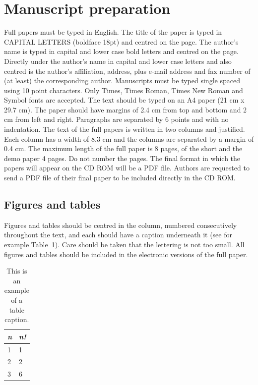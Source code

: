 \documentclass{article}\usepackage{graphicx, color}
\begin{document}
\section{Manuscript preparation}
Full papers must be typed in English. The title of the
paper is typed in CAPITAL LETTERS (boldface 18pt)
and centred on the page. The author's name is typed in
capital and lower case bold letters and centred on the
page. Directly under the author's name in capital and
lower case letters and also centred is the author's
affiliation, address, plus e-mail address and fax number of
(at least) the corresponding author. Manuscripts must be
typed single spaced using 10 point characters. Only
Times, Times Roman, Times New Roman and Symbol
fonts are accepted. The text should be typed on an A4
paper (21 cm x 29.7 cm). The paper should have margins
of 2.4 cm from top and bottom and 2 cm from left and
right. Paragraphs are separated by 6 points and with no
indentation. The text of the full papers is written in two
columns and justified. Each column has a width of 8.3 cm
and the columns are separated by a margin of 0.4 cm. The
maximum length of the full paper is 8 pages, of the short
and the demo paper 4 pages. Do not number the pages.
The final format in which the papers will appear on the
CD ROM will be a PDF file. Authors are requested to send
a PDF file of their final paper to be included directly
in the CD ROM.

\subsection{Figures and tables}
Figures and tables should be centred in the column,
numbered consecutively throughout the text, and each
should have a caption underneath it (see for example
Table~\ref{tab1}). Care should be taken that the lettering
is not too small. All figures and tables should be included
in the electronic versions of the full paper.


\begin{table}[htb!]
\begin{center}

\begin{tabular}{|l|l|}
\hline
{\em n} & {\em n!} \\
\hline
1 & 1  \\
2 & 2  \\
3  & 6\\
\hline
\end{tabular}
\end{center}
\caption{\label{tab1}This is an example of a table caption.}
\end{table}
\end{document}

